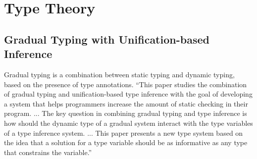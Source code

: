 \chapter {Type Theory}

\section {Gradual Typing with Unification-based Inference \cite{siek2008gradual}}
Gradual typing is a combination between static typing and dynamic typing, based
on the presence of type annotations. ``This paper studies the combination of
gradual typing and unification-based type inference with the goal of developing
a system that helps programmers increase the amount of static checking in their
program. ... The key question in combining gradual typing and type inference is
how should the dynamic type of a gradual system interact with the type variables
of a type inference system. ... This paper presents a new type system based on
the idea that a solution for a type variable should be as informative as any
type that constrains the variable.''